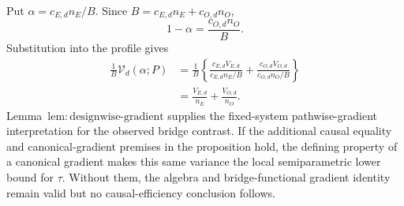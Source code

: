 Put \(\alpha=c_{E,d}n_E/B\). Since \(B=c_{E,d}n_E+c_{O,d}n_O\),
\[
1-\alpha=\frac{c_{O,d}n_O}{B}.
\]
Substitution into the profile gives
\[
\begin{aligned}
\frac1B\mathcal V_d(\alpha;P)
&=\frac1B\left\{
\frac{c_{E,d}V_{E,d}}{c_{E,d}n_E/B}
+\frac{c_{O,d}V_{O,d}}{c_{O,d}n_O/B}\right\}\\
&=\frac{V_{E,d}}{n_E}+\frac{V_{O,d}}{n_O}.
\end{aligned}
\]
Lemma~\(\mathrm{lem{:}designwise\text{-}gradient}\) supplies the fixed-system pathwise-gradient interpretation for the observed bridge contrast. If the additional causal equality and canonical-gradient premises in the proposition hold, the defining property of a canonical gradient makes this same variance the local semiparametric lower bound for \(\tau\). Without them, the algebra and bridge-functional gradient identity remain valid but no causal-efficiency conclusion follows.